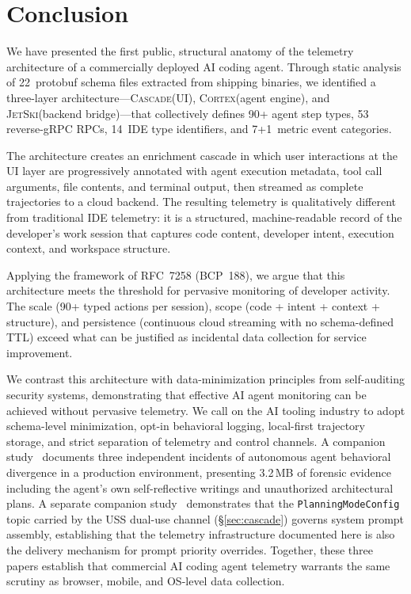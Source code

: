 \documentclass[sigconf,anonymous]{acmart}
\newcommand{\cascade}{\textsc{Cascade}\xspace}
\newcommand{\cortex}{\textsc{Cortex}\xspace}
\newcommand{\jetski}{\textsc{JetSki}\xspace}
\begin{document}
\section{Conclusion}\label{sec:conclusion}

We have presented the first public, structural anatomy of the telemetry
architecture of a commercially deployed AI coding agent.  Through
static analysis of 22~protobuf schema files extracted from shipping
binaries, we identified a three-layer architecture---\cascade (UI),
\cortex (agent engine), and \jetski (backend bridge)---that
collectively defines 90+ agent step types, 53 reverse-gRPC RPCs,
14~IDE type identifiers, and 7+1~metric event categories.

The architecture creates an enrichment cascade in which user
interactions at the UI layer are progressively annotated with agent
execution metadata, tool call arguments, file contents, and terminal
output, then streamed as complete trajectories to a cloud backend.
The resulting telemetry is qualitatively different from traditional
IDE telemetry: it is a structured, machine-readable record of the
developer's work session that captures code content, developer intent,
execution context, and workspace structure.

Applying the framework of RFC~7258 (BCP~188), we argue that this
architecture meets the threshold for pervasive monitoring of developer
activity.  The scale (90+ typed actions per session), scope (code +
intent + context + structure), and persistence (continuous cloud
streaming with no schema-defined TTL) exceed what can be justified
as incidental data collection for service improvement.

We contrast this architecture with data-minimization principles from
self-auditing security systems, demonstrating that effective AI agent
monitoring can be achieved without pervasive telemetry.  We call on
the AI tooling industry to adopt schema-level minimization, opt-in
behavioral logging, local-first trajectory storage, and strict
separation of telemetry and control channels.
A companion study~\cite{rogue-agent} documents three independent
incidents of autonomous agent behavioral divergence in a production
environment, presenting 3.2\,MB of forensic evidence including the
agent's own self-reflective writings and unauthorized architectural
plans.  A separate companion study~\cite{ring0ring3} demonstrates
that the \texttt{PlanningModeConfig} topic carried by the USS
dual-use channel (\S\ref{sec:cascade}) governs system prompt assembly,
establishing that the telemetry infrastructure documented here is
also the delivery mechanism for prompt priority overrides.  Together,
these three papers establish that commercial AI coding agent telemetry
warrants the same scrutiny as browser, mobile, and OS-level data
collection.
\end{document}
